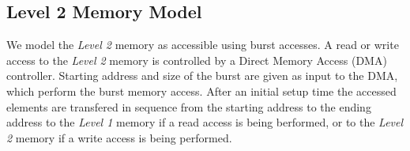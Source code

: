 \subsection{Level 2 Memory Model}
\label{ssec:layer2_model}
We model the \textit{Level 2} memory as accessible using burst accesses. 
A read or write access to the \textit{Level 2} memory is controlled by a Direct Memory Access (DMA) controller. Starting address and size of the burst are given as input to the DMA, which perform the burst memory access. After an initial setup time the accessed elements are transfered in sequence from the starting address to the ending address to the \textit{Level 1} memory if a read access is being berformed, or to the \textit{Level 2} memory if a write access is being performed.

